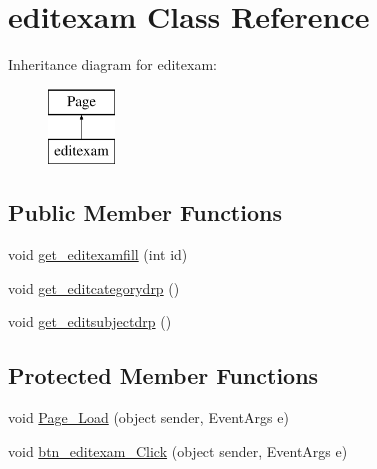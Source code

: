\hypertarget{classeditexam}{}\section{editexam Class Reference}
\label{classeditexam}
Inheritance diagram for editexam\+:\begin{figure}[H]
\begin{center}
\leavevmode
\includegraphics[height=2.000000cm]{classeditexam}
\end{center}
\end{figure}
\subsection*{Public Member Functions}
\begin{DoxyCompactItemize}
\item 
void \mbox{\hyperlink{classeditexam_a5e806d313051900dcdb2260677921b42}{get\+\_\+editexamfill}} (int id)
\item 
void \mbox{\hyperlink{classeditexam_a67a3a99e76198aa9a8e0a25709a05b8f}{get\+\_\+editcategorydrp}} ()
\item 
void \mbox{\hyperlink{classeditexam_acc3ccb653eb472fce04dfa39a22afd7c}{get\+\_\+editsubjectdrp}} ()
\end{DoxyCompactItemize}
\subsection*{Protected Member Functions}
\begin{DoxyCompactItemize}
\item 
void \mbox{\hyperlink{classeditexam_a1195c4cbf166ea2485446852b59c1b36}{Page\+\_\+\+Load}} (object sender, Event\+Args e)
\item 
void \mbox{\hyperlink{classeditexam_a8f00c0059191a10ad60dc7ad3f51eb71}{btn\+\_\+editexam\+\_\+\+Click}} (object sender, Event\+Args e)
\end{DoxyCompactItemize}
